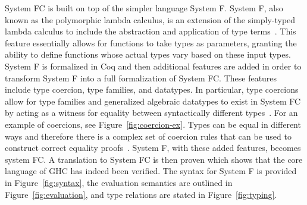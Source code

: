 \documentclass{sig-alternate}
\begin{document}
System FC is built on top of the simpler language System F. System F, also known as the polymorphic lambda calculus, is an extension of the simply-typed lambda calculus to include the abstraction and application of type terms~\cite{Pierce:TAPL}. This feature essentially allows for functions to take types as parameters, granting the ability to define functions whose actual types vary based on these input types. System F is formalized in Coq and then additional features are added in order to transform System F into a full formalization of System FC. These features include type coercion, type families, and datatypes. In particular, type coercions allow for type families and generalized algebraic datatypes to exist in System FC by acting as a witness for equality between syntactically different types~\cite{DBLP:conf/rta/VytiniotisJ13}. For an example of coercions, see Figure~\ref{fig:coercion-ex}. Types can be equal in different ways and therefore there is a complex set of coercion rules that can be used to construct correct equality proofs~\cite{Breitner:2014:SZC:2628136.2628141}. System F, with these added features, becomes system FC. A translation to System FC is then proven which shows that the core language of GHC has indeed been verified. The syntax for System F is provided in Figure~\ref{fig:syntax}, the evaluation semantics are outlined in Figure~\ref{fig:evaluation}, and type relations are stated in Figure~\ref{fig:typing}.
\newcommand\mybox[2][]{#2}%
\end{document}
